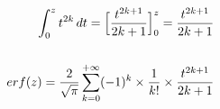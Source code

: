 \documentclass[preview]{standalone}
\begin{document}
\begin{align*}
\int_0^z { t^{2k} } \, dt = \Big[ \frac{t^{2k+1}}{2k+1} \Big]_0^z = \frac{t^{2k+1}}{2k+1} \\ \\ erf(z) = { \frac{2}{\sqrt{\pi}} } \sum_{k=0}^{+\infty} (-1)^k \times { {1} \over {k!} } \times { {t^{2k+1}} \over {2k+1} }
\end{align*}
\end{document}
